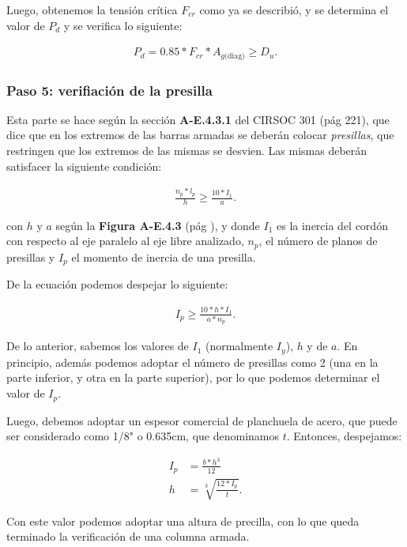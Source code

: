 \documentclass[../main.tex]{subfiles}
\begin{document}
Luego, obtenemos la tensión crítica $F_{cr}$ como ya se describió, y se determina
el valor de $P_d$ y se verifica lo siguiente:

\begin{align*}
  P_d = 0.85 * F_{cr} * A_{g \text{(diag)}} \geq D_u
.\end{align*}

\subsubsection{Paso 5: verifiación de la presilla}

Esta parte se hace según la sección \textbf{A-E.4.3.1} del CIRSOC 301 (pág 221),
que dice que en los extremos de las barras armadas se deberán colocar
\textit{presillas}, que restringen que los extremos de las mismas se desvien. Las
mismas deberán satisfacer la siguiente condición:

\begin{align*}
  \frac{n_p * l_p}{h} \geq \frac{10 * I_1}{a}
.\end{align*}

con $h$ y $a$ según la  \textbf{Figura A-E.4.3} (pág ), y donde $I_1$ es la 
inercia del cordón con respecto al eje paralelo al eje libre analizado,  $n_p$,
el número  de planos de presillas y $I_p$ el momento de inercia de una presilla.

De la ecuación podemos despejar lo siguiente:

\begin{align*}
  I_p \geq \frac{10 * h * I_1}{a * n_p}
.\end{align*}

De lo anterior, sabemos los valores de $I_1$ (normalmente $I_y$), $h$ y de $a$.
En principio, además podemos adoptar el número de presillas como 2 (una en la
parte inferior, y otra en la parte superior), por lo que podemos determinar el
valor de $I_p$.

Luego, debemos adoptar un espesor comercial de planchuela de acero, que puede
ser considerado como 1/8" o 0.635cm, que denominamos $t$. Entonces, despejamos:

 \begin{align*}
  I_p  &= \frac{b*h^3}{12} \\[5pt]
  h &= \sqrt[3]{\frac{12*I_p}{t}} 
.\end{align*}

Con este valor podemos adoptar una altura de precilla, con lo que queda
terminado la verificación de una columna armada.
\end{document}
